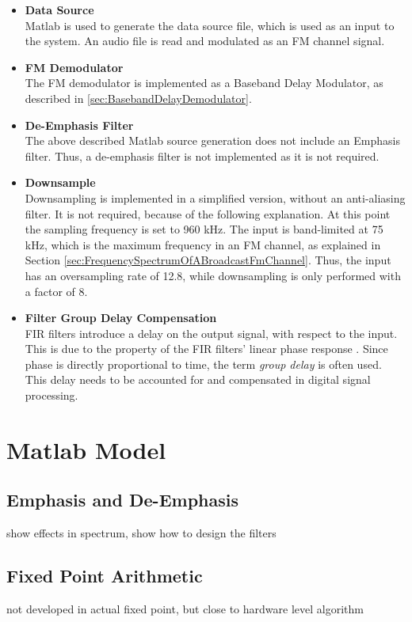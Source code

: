 \begin{itemize}
  \item \textbf{Data Source}\\
    Matlab is used to generate the data source file, which is used as an input to the system.
    An audio file is read and modulated as an FM channel signal.
  \item \textbf{FM Demodulator}\\
    The FM demodulator is implemented as a Baseband Delay Modulator, as described in \ref{sec:BasebandDelayDemodulator}.
  \item \textbf{De-Emphasis Filter}\\
    The above described Matlab source generation does not include an Emphasis filter.
    Thus, a de-emphasis filter is not implemented as it is not required.
  \item \textbf{Downsample}\\
    Downsampling is implemented in a simplified version, without an anti-aliasing filter.
    It is not required, because of the following explanation.
    At this point the sampling frequency is set to 960 kHz.
    The input is band-limited at 75 kHz, which is the maximum frequency in an FM channel, as explained in Section \ref{sec:FrequencySpectrumOfABroadcastFmChannel}.
    Thus, the input has an oversampling rate of 12.8, while downsampling is only performed with a factor of 8.
  \item \textbf{Filter Group Delay Compensation}\\
    FIR filters introduce a delay on the output signal, with respect to the input.
    This is due to the property of the FIR filters' linear phase response \cite{GaziOrhan2018UDSP}.
    Since phase is directly proportional to time, the term \textit{group delay} is often used.
    This delay needs to be accounted for and compensated in digital signal processing.

\end{itemize}

\section{Matlab Model}

\subsection{Emphasis and De-Emphasis}
show effects in spectrum, show how to design the filters

\subsection{Fixed Point Arithmetic}
not developed in actual fixed point, but close to hardware level algorithm



